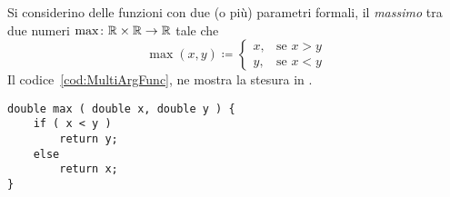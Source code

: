 Si considerino delle funzioni con due (o più) parametri formali, il \emph{massimo} tra due numeri $\max\colon\mathbb{R}\times\mathbb{R}\to\mathbb{R}$ tale che 
\[
\mathop{\mathrm{max}}(x,y)\coloneqq
		\begin{cases}
x,	& \text{se } x>y \\
y,	& \text{se } x<y
		\end{cases}
\]
Il codice~\vref{cod:MultiArgFunc}, ne mostra la stesura in .
\begin{lstlisting}[caption={\em Funzione \lstinline!max()!, con due argomenti.}, label={cod:MultiArgFunc}]
double max ( double x, double y ) {
	if ( x < y )
		return y;
	else
		return x;
}
\end{lstlisting}